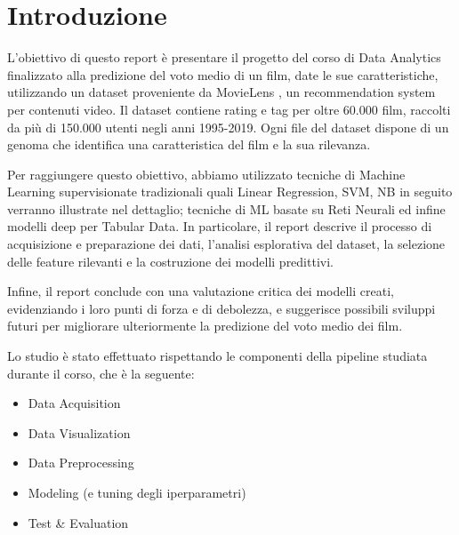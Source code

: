 \documentclass[../../Report.tex]{subfiles}
\begin{document}
\chapter{Introduzione}
L'obiettivo di questo report è presentare il progetto del corso di Data Analytics finalizzato alla predizione del voto medio di un film, date le sue caratteristiche, utilizzando un dataset proveniente da MovieLens \cite{movielens}, un recommendation system per contenuti video.
Il dataset contiene rating e tag per oltre 60.000 film, raccolti da più di 150.000 utenti negli anni 1995-2019. Ogni file del dataset dispone di un genoma che identifica una caratteristica del film e la sua rilevanza.

Per raggiungere questo obiettivo, abbiamo utilizzato tecniche di Machine Learning supervisionate tradizionali quali Linear Regression, SVM, NB in seguito verranno illustrate nel dettaglio; tecniche di ML basate su Reti Neurali ed infine modelli deep per Tabular Data.
In particolare, il report descrive il processo di acquisizione e preparazione dei dati, l'analisi esplorativa del dataset, la selezione delle feature rilevanti e la costruzione dei modelli predittivi.

Infine, il report conclude con una valutazione critica dei modelli creati, evidenziando i loro punti di forza e di debolezza, e suggerisce possibili sviluppi futuri per migliorare ulteriormente la predizione del voto medio dei film.

Lo studio è stato effettuato rispettando le componenti della pipeline studiata durante il corso, che è la seguente:
\begin{itemize}
    \item Data Acquisition
    \item Data Visualization
    \item Data Preprocessing
    \item Modeling (e tuning degli iperparametri)
    \item Test \& Evaluation
\end{itemize}
\end{document}

